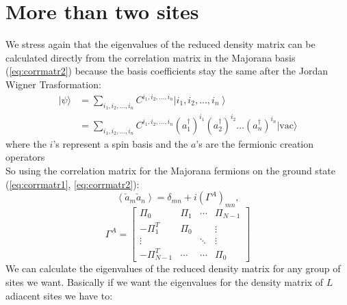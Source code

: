 \documentclass[12pt,a4paper]{book}
\theoremstyle{definition}
\begin{document}
\section{More than two sites }
We stress again \cite{Latorre_2009} that  the eigenvalues of the reduced density matrix can be calculated directly from the correlation matrix in the Majorana basis (\ref{eq:corrmatr2}) because the basis  coefficients stay the same after the Jordan Wigner Trasformation:
\begin{equation}
	\begin{aligned}
		|\psi\rangle &=\sum_{i_{1}, i_{2}, \ldots, i_{n}} C^{i_{1}, i_{2}, \ldots, i_{n}}\left|i_{1}, i_{2}, \ldots, i_{n}\right\rangle \\
		&=\sum_{i_{1}, i_{2}, \ldots, i_{n}} C^{i_{1}, i_{2}, \ldots, i_{n}} (a_{1}^{\dagger})^{i_{1}}(a_{2}^{\dagger})^{i_{2}} \ldots(a_{n}^{\dagger})^{i_{n}}|\mathrm{vac}\rangle
	\end{aligned}
\end{equation}
where the $i$'s represent a spin basis and the $a$'s are the fermionic creation operators\\
So using the correlation matrix for the Majorana fermions on the ground state (\ref{eq:corrmatr1}, \ref{eq:corrmatr2}):
\begin{equation}
	\left\langle\check{a}_{m} \check{a}_{n}\right\rangle=\delta_{m n}+i\left(\Gamma^{A}\right)_{m n}, 
\end{equation}
\begin{equation}
	\Gamma^{A}=\left[\begin{array}{cccc}
		\Pi_{0} & \Pi_{1} & \cdots & \Pi_{N-1} \\
		-\Pi_{1}^T & \Pi_{0} & & \vdots \\
		\vdots & & \ddots & \vdots \\
		-\Pi_{N-1}^T & \cdots & \cdots & \Pi_{0}
	\end{array}\right]
\end{equation}
We can calculate the eigenvalues of the reduced density matrix for any group of sites we want. Basically if we want the eigenvalues for the density matrix of $L$ adiacent sites we have to:\\
\end{document}
